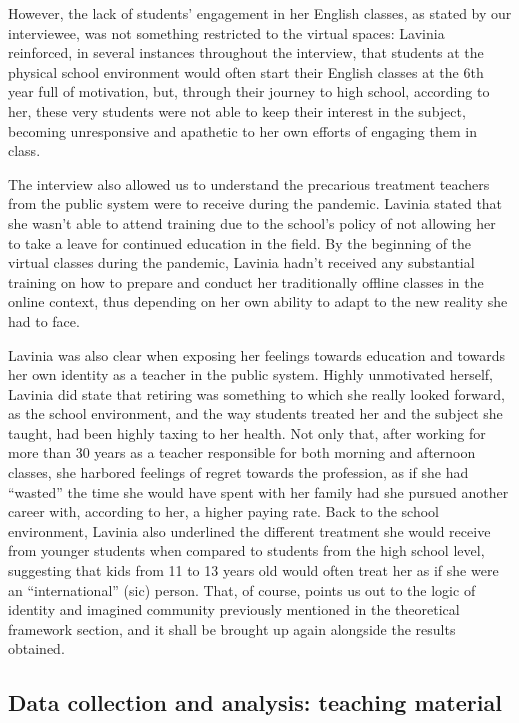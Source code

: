 \documentclass[english]{textolivre}
\begin{document}
However, the lack of students’ engagement in her English classes, as stated by our interviewee, was not something restricted to the virtual spaces: Lavinia reinforced, in several instances throughout the interview, that students at the physical school environment would often start their English classes at the 6th year full of motivation, but, through their journey to high school, according to her, these very students were not able to keep their interest in the subject, becoming unresponsive and apathetic to her own efforts of engaging them in class.

The interview also allowed us to understand the precarious treatment teachers from the public system were to receive during the pandemic. Lavinia stated that she wasn’t able to attend training due to the school’s policy of not allowing her to take a leave for continued education in the field. By the beginning of the virtual classes during the pandemic, Lavinia hadn’t received any substantial training on how to prepare and conduct her traditionally offline classes in the online context, thus depending on her own ability to adapt to the new reality she had to face.

Lavinia was also clear when exposing her feelings towards education and towards her own identity as a teacher in the public system. Highly unmotivated herself, Lavinia did state that retiring was something to which she really looked forward, as the school environment, and the way students treated her and the subject she taught, had been highly taxing to her health. Not only that, after working for more than 30 years as a teacher responsible for both morning and afternoon classes, she harbored feelings of regret towards the profession, as if she had “wasted” the time she would have spent with her family had she pursued another career with, according to her, a higher paying rate. Back to the school environment, Lavinia also underlined the different treatment she would receive from younger students when compared to students from the high school level, suggesting that kids from 11 to 13 years old would often treat her as if she were an “international” (sic) person. That, of course, points us out to the logic of identity and imagined community previously mentioned in the theoretical framework section, and it shall be brought up again alongside the results obtained.



\subsection{Data collection and analysis: teaching material}
\end{document}
